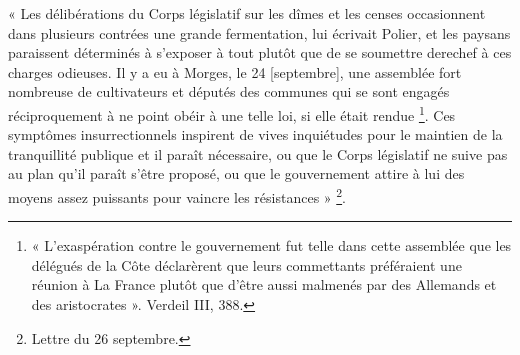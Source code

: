 \documentclass[french,twoside]{book} %
\newenvironment{quoteblock}%
  {\begin{quoting}}
  {\end{quoting}}
\newenvironment{quotebar}{%
    \def\FrameCommand{{\color{rubric!10!}\vrule width 0.5em} \hspace{0.9em}}%
    \def\OuterFrameSep{\itemsep} %
    \MakeFramed {\advance\hsize-\width \FrameRestore}
  }%
  {%
    \endMakeFramed
  }
\renewenvironment{quoteblock}%
  {%
    \savenotes
    \setstretch{0.9}
    \begin{quotebar}
  }
  {%
    \end{quotebar}
    \spewnotes
  }
\begin{document}
\begin{quoteblock}
 \noindent « Les délibérations du Corps législatif sur les dîmes et les censes occasionnent dans plusieurs contrées une grande fermentation, lui écrivait Polier, et les paysans paraissent déterminés à s’exposer à tout plutôt que de se soumettre derechef à ces charges odieuses. Il y a eu à Morges, le 24 [septembre], une assemblée fort nombreuse de cultivateurs et députés des communes qui se sont engagés réciproquement à ne point obéir à une telle loi, si elle était rendue \footnote{« L’exaspération contre le gouvernement fut telle dans cette assemblée que les délégués de la Côte déclarèrent que leurs commettants préféraient une réunion à La France plutôt que d’être aussi malmenés par des Allemands et des aristocrates ». Verdeil III, 388.}. Ces symptômes insurrectionnels inspirent de vives inquiétudes pour le maintien de la tranquillité publique et il paraît nécessaire, ou que le Corps législatif ne suive pas au plan qu’il paraît s’être proposé, ou que le gouvernement attire à lui des moyens assez puissants pour vaincre les résistances » \footnote{Lettre du 26 septembre.}.
 \end{quoteblock}
\end{document}
